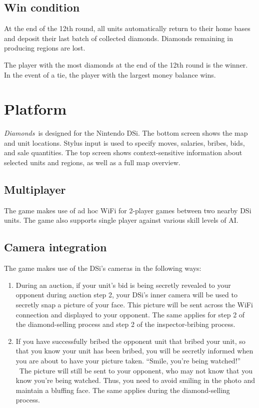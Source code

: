 \documentclass[12pt]{article}
\newcommand{\gtitle}{{\it Diamonds}}
\begin{document}
\subsection{Win condition}
At the end of the 12th round, all units automatically return to their home bases and deposit their last batch of collected diamonds.  Diamonds remaining in producing regions are lost.

The player with the most diamonds at the end of the 12th round is the winner.  In the event of a tie, the player with the largest money balance wins.


\section{Platform}

\gtitle\ is designed for the Nintendo DSi.  The bottom screen shows the map and unit locations.  Stylus input is used to specify moves, salaries, bribes, bids, and sale quantities.  The top screen shows context-sensitive information about selected units and regions, as well as a full map overview.

\subsection{Multiplayer}

The game makes use of ad hoc WiFi for 2-player games between two nearby DSi units.  The game also supports single player against various skill levels of AI.

\subsection{Camera integration}
The game makes use of the DSi's cameras in the following ways:
\begin{enumerate}

\item During an auction, if your unit's bid is being secretly revealed to your opponent during auction step 2, your DSi's inner camera will be used to secretly snap a picture of your face.  This picture will be sent across the WiFi connection and displayed to your opponent.  The same applies for step 2 of the diamond-selling process and step 2 of the inspector-bribing process.

\item If you have successfully bribed the opponent unit that bribed your unit, so that you know your unit has been bribed, you will be secretly informed when you are about to have your picture taken.  ``Smile, you're being watched!'' \  The picture will still be sent to your opponent, who may not know that you know you're being watched.  Thus, you need to avoid smiling in the photo and maintain a bluffing face.  The same applies during the diamond-selling process.

\end{enumerate}
\end{document}
